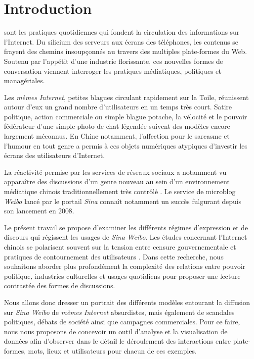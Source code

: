 \chapter*{Introduction}


 sont les pratiques quotidiennes qui fondent la circulation des informations sur l'Internet. Du silicium des serveurs aux écrans des téléphones, les contenus se frayent des chemins insoupçonnés au travers des multiples plate-formes du Web. Soutenu par l'appétit d'une industrie florissante, ces nouvelles formes de conversation viennent interroger les pratiques médiatiques, politiques et managériales. 

Les \textit{mèmes Internet}, petites blagues circulant rapidement sur la Toile, réunissent autour d'eux un grand nombre d'utilisateurs en un temps très court. Satire politique, action commerciale ou simple blague potache, la vélocité et le pouvoir fédérateur d'une simple photo de chat légendée suivent des modèles encore largement méconnus. En Chine notamment, l'affection pour le sarcasme et l'humour en tout genre a permis à ces objets numériques atypiques d'investir les écrans des utilisateurs d'Internet.

La réactivité permise par les services de réseaux sociaux a notamment vu apparaître des discussions d'un genre nouveau au sein d'un environnement médiatique chinois traditionnellement très contrôlé \citep{MacKinnon2009, Douzet2007, Yang2008}. Le service de microblog \textit{Weibo} lancé par le portail \textit{Sina} connaît notamment un succès fulgurant depuis son lancement en 2008.

Le présent travail se propose d'examiner les différents régimes d'expression et de discours qui régissent les usages de \textit{Sina Weibo}. Les études concernant l'Internet chinois se polarisent souvent sur la tension entre censure gouvernementale \cite{Ng2014} et pratiques de contournement des utilisateurs \citep{Yang2014}. Dans cette recherche, nous souhaitons aborder plus profondément la complexité des relations entre pouvoir politique, industries culturelles et usages quotidiens pour proposer une lecture contrastée des formes de discussions.

Nous allons donc dresser un portrait des différents modèles entourant la  diffusion sur \textit{Sina Weibo} de \textit{mèmes Internet} absurdistes, mais également de scandales politiques, débats de société ainsi que campagnes commerciales. Pour ce faire, nous nous proposons de concevoir un outil d'analyse et la visualisation de données afin d'observer dans le détail le déroulement des interactions entre plate-formes, mots, lieux et utilisateurs pour chacun de ces exemples.


